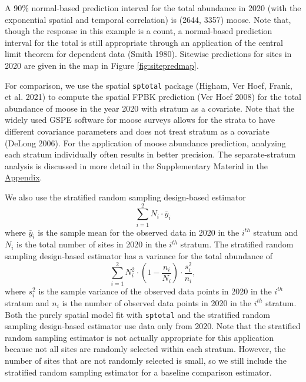 \documentclass[]{article}    %
\begin{document}
A 90\% normal-based prediction interval for the total abundance in 2020
(with the exponential spatial and temporal correlation) is (2644, 3357)
moose. Note that, though the response in this example is a count, a
normal-based prediction interval for the total is still appropriate
through an application of the central limit theorem for dependent data
(Smith 1980). Sitewise predictions for sites in 2020 are given in the
map in Figure \ref{fig:sitepredmap}.

For comparison, we use the spatial \texttt{sptotal} package (Higham, Ver
Hoef, Frank, et al. 2021) to compute the spatial FPBK prediction (Ver
Hoef 2008) for the total abundance of moose in the year 2020 with
stratum as a covariate. Note that the widely used GSPE software for
moose surveys allows for the strata to have different covariance
parameters and does not treat stratum as a covariate (DeLong 2006). For
the application of moose abundance prediction, analyzing each stratum
individually often results in better precision. The separate-stratum
analysis is discussed in more detail in the Supplementary Material in
the \protect\hyperlink{appendix}{Appendix}.

We also use the stratified random sampling design-based estimator
\mbox{} \begin{equation*}
\sum_{i = 1}^{2} N_i \cdot \bar{y}_i
\end{equation*} \noindent where \(\bar{y}_i\) is the sample mean for the
observed data in 2020 in the \(i^{th}\) stratum and \(N_i\) is the total
number of sites in 2020 in the \(i^{th}\) stratum. The stratified random
sampling design-based estimator has a variance for the total abundance
of \mbox{} \begin{equation*}
\sum_{i = 1}^{2} N_i^2 \cdot \left(1 - \frac{n_i}{N_i}\right) \cdot \frac{s^2_i}{n_i},
\end{equation*} \noindent where \(s^2_i\) is the sample variance of the
observed data points in 2020 in the \(i^{th}\) stratum and \(n_i\) is
the number of observed data points in 2020 in the \(i^{th}\) stratum.
Both the purely spatial model fit with \texttt{sptotal} and the
stratified random sampling design-based estimator use data only from
2020. Note that the stratified random sampling estimator is not actually
appropriate for this application because not all sites are randomly
selected within each stratum. However, the number of sites that are not
randomly selected is small, so we still include the stratified random
sampling estimator for a baseline comparison estimator.
\end{document}
